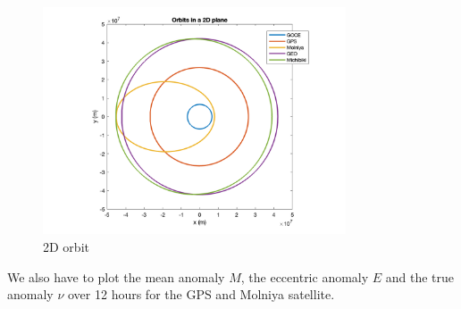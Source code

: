 \documentclass[12pt
,headinclude
,headsepline
,bibtotocnumbered
]{scrartcl}
\begin{document}
\begin{figure}[H]
    \centering
    \includegraphics[width=0.8\textwidth]{plots/orb2d.png}
    \caption{2D orbit}
    \label{fig:2D_orbit}
\end{figure}
We also have to plot the mean anomaly $M$, the eccentric anomaly $E$ and the true anomaly $\nu$ over 12 hours for the GPS and Molniya satellite.
\end{document}
